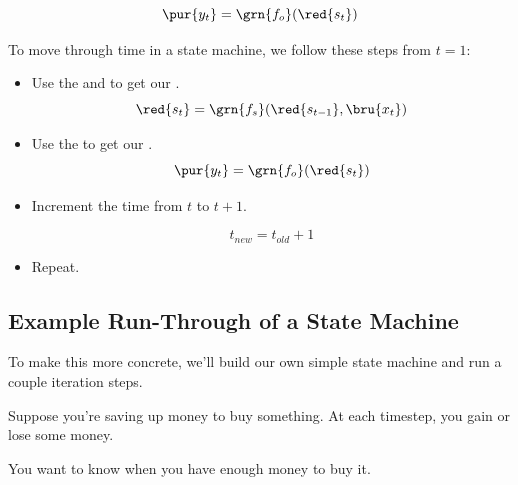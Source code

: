         \begin{equation}
            \pur{y_t} = 
            \grn{f_o}(\red{s_t})
        \end{equation}
        
        
        \begin{concept}
            To move through time in a state machine, we follow these steps from $t=1$:
            
            \begin{itemize}
                \item Use the  and  to get our .
                    \begin{equation*}
                        \red{s_t} = 
                        \grn{f_s}(\red{s_{t-1}}, \bru{x_t})
                    \end{equation*}
                    
                \item Use the  to get our .
                    \begin{equation*}
                        \pur{y_t} = 
                        \grn{f_o}(\red{s_t})
                    \end{equation*}
                    
                \item Increment the time from $t$ to $t+1$.
                
                    \begin{equation*}
                        t_{new} = t_{old} + 1
                    \end{equation*}
                
                \item Repeat.
            \end{itemize}
        \end{concept}

    \subsection{Example Run-Through of a State Machine}

        To make this more concrete, we'll build our own simple state machine and run a couple iteration steps.
                
        Suppose you're saving up money to buy something. At each timestep, you gain or lose some money. 
        
        You want to know when you have enough money to buy it. 
            
